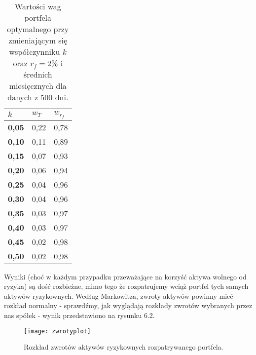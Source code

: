 \documentclass[magister]{dyplom}
\begin{document}
\begin{table}[ht!]
	\centering
	\caption{Wartości wag portfela optymalnego przy zmieniającym się współczynniku $k$ oraz $r_f = 2\%$ i średnich miesięcznych dla danych z 500 dni.}
	\begin{tabular}{|l|l|l|}
		\hline
		\textbf{$k$} & \textbf{$w_T$} & \textbf{$w_{r_f}$} \\ \hline
		\textbf{0,05}                                             & 0,22          & 0,78           \\ \hline
		\textbf{0,10}                                             & 0,11          & 0,89           \\ \hline
		\textbf{0,15}                                             & 0,07          & 0,93           \\ \hline
		\textbf{0,20}                                             & 0,06          & 0,94           \\ \hline
		\textbf{0,25}                                             & 0,04          & 0,96           \\ \hline
		\textbf{0,30}                                             & 0,04          & 0,96           \\ \hline
		\textbf{0,35}                                             & 0,03          & 0,97           \\ \hline
		\textbf{0,40}                                             & 0,03          & 0,97           \\ \hline
		\textbf{0,45}                                             & 0,02          & 0,98           \\ \hline
		\textbf{0,50}                                             & 0,02          & 0,98           \\ \hline
	\end{tabular}
\end{table}

\newpage
Wyniki (choć w każdym przypadku przeważające na korzyść aktywa wolnego od ryzyka) są dość rozbieżne, mimo tego że rozpatrujemy wciąż portfel tych samych aktywów ryzykownych. Według Markowitza, zwroty aktywów powinny mieć rozkład normalny - sprawdźmy, jak wyglądają rozkłady zwrotów wybranych przez nas spółek - wynik przedstawiono na rysunku 6.2.

\begin{figure}[ht]
	\centering
	\texttt{[image: zwrotyplot]}
	\caption{Rozkład zwrotów aktywów ryzykownych rozpatrywanego portfela.}
\end{figure}
\end{document}
